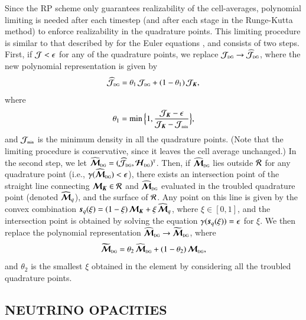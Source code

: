 \documentclass[11pt,letterpaper,twoside,english,final]{article}
\begin{document}
Since the RP scheme only guarantees realizability of the cell-averages, polynomial limiting is needed after each timestep (and after each stage in the Runge-Kutta method) to enforce realizability in the quadrature points.  
This limiting procedure is similar to that described by \citet{ZS2010a} for the Euler equations \citep[see also][]{liuOsher_1996}, and consists of two steps.  
First, if $\mathcal{J}<\epsilon$ for any of the quadrature points, we replace $\mathcal{J}_{\mbox{\tiny DG}}\to\widehat{\mathcal{J}}_{\mbox{\tiny DG}}$, where the new polynomial representation is given by
\begin{equation}
  \widehat{\mathcal{J}}_{\mbox{\tiny DG}}=\theta_{1}\,\mathcal{J}_{\mbox{\tiny DG}}+(1-\theta_{1})\,\mathcal{J}_{\boldsymbol{K}},
\end{equation}
where
\begin{equation}
  \theta_{1}=\min\Big\{1,\frac{\mathcal{J}_{\boldsymbol{K}}-\epsilon}{\mathcal{J}_{\boldsymbol{K}}-\mathcal{J}_{\mbox{\tiny min}}}\Big\},
\end{equation}
and $\mathcal{J}_{\mbox{\tiny min}}$ is the minimum density in all the quadrature points.  
(Note that the limiting procedure is conservative, since it leaves the cell average unchanged.)  
In the second step, we let $\widehat{\boldsymbol{\mathcal{M}}}_{\mbox{\tiny DG}}=(\widehat{\mathcal{J}}_{\mbox{\tiny DG}},\boldsymbol{\mathcal{H}}_{\mbox{\tiny DG}})^{\mbox{\tiny T}}$.  
Then, if $\widehat{\boldsymbol{\mathcal{M}}}_{\mbox{\tiny DG}}$ lies outside $\mathcal{R}$ for any quadrature point (i.e., $\gamma(\widehat{\boldsymbol{\mathcal{M}}}_{\mbox{\tiny DG}})<\epsilon$), there exists an intersection point of the straight line connecting $\boldsymbol{\mathcal{M}}_{\boldsymbol{K}}\in\mathcal{R}$ and $\widehat{\boldsymbol{\mathcal{M}}}_{\mbox{\tiny DG}}$ evaluated in the troubled quadrature point (denoted $\widehat{\boldsymbol{\mathcal{M}}}_{q}$), and the surface of $\mathcal{R}$.  
Any point on this line is given by the convex combination $\boldsymbol{s}_{q}(\xi)=(1-\xi)\,\boldsymbol{\mathcal{M}}_{\boldsymbol{K}}+\xi\,\widehat{\boldsymbol{\mathcal{M}}}_{q}$, where $\xi\in[0,1]$, and the intersection point is obtained by solving the equation $\gamma(\boldsymbol{s}_{q}(\xi))=\epsilon$ for $\xi$.  
We then replace the polynomial representation $\widehat{\boldsymbol{\mathcal{M}}}_{\mbox{\tiny DG}}\to\widetilde{\boldsymbol{\mathcal{M}}}_{\mbox{\tiny DG}}$, where
\begin{equation}
  \widetilde{\boldsymbol{\mathcal{M}}}_{\mbox{\tiny DG}}=\theta_{2}\,\widehat{\boldsymbol{\mathcal{M}}}_{\mbox{\tiny DG}}+(1-\theta_{2})\,\boldsymbol{\mathcal{M}}_{\mbox{\tiny DG}},
\end{equation}
and $\theta_{2}$ is the smallest $\xi$ obtained in the element by considering all the troubled quadrature points.  

\begin{center}
  \section{NEUTRINO OPACITIES}
  \label{sec:opacities}
\end{center}
\end{document}
